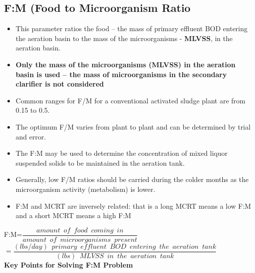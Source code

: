 \subsection{F:M (Food to Microorganism Ratio}
\begin{itemize}
\item This parameter ratios the food – the mass of primary effluent BOD entering the aeration basin to the mass of the microorganisms - \textbf{MLVSS}, in the aeration basin.
\item \textbf{Only the mass of the microorganisms (MLVSS) in the aeration basin is used – the mass of microorganisms in the secondary clarifier is not considered}
\item Common ranges for F/M for a conventional activated sludge plant are from 0.15 to 0.5. 
\item The optimum F/M varies from plant to plant and can be determined by trial and error.
\item The F:M may be used to determine the concentration of mixed liquor suspended solids to be maintained in the aeration tank.
\item Generally, low F/M ratios should be carried during the colder months as the microorganism activity (metabolism) is lower.
\item F:M and MCRT are inversely related: that is a long MCRT means a low F:M and a short MCRT means a high F:M
\end{itemize}
F:M=$\dfrac{amount \enspace of \enspace food \enspace coming \enspace in}{amount \enspace of \enspace microorganisms \enspace present}$\\
\vspace{0.3cm}
\hspace{0.7cm}$=\dfrac{(lbs/day) \enspace primary \enspace effluent  \enspace BOD \enspace entering \enspace the  \enspace aeration \enspace tank}{(lbs) \enspace MLVSS \enspace in \enspace the  \enspace aeration \enspace tank}$\\
\vspace{0.3cm}
\textbf{Key Points for Solving F:M Problem}\\
